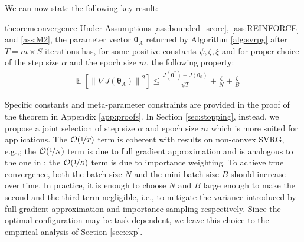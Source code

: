 \documentclass{article}
\makeatletter
\theoremstyle{remark}
\theoremstyle{definition}
\DeclareRobustCommand{\eg}{e.g.,\@\xspace}
\DeclareRobustCommand{\ie}{i.e.,\@\xspace}
\DeclareMathOperator*{\EV}{\mathbb{E}}
\newcommand{\EVV}[2][\ppvect \in \ppspace]{\EV_{#1}\left[{#2}\right]}
\newcommand{\norm}[2][\infty]{\left\|#2\right\|_{#1}}
\newcommand{\vtheta}{\boldsymbol{\theta}}
\makeatother
\begin{document}
We can now state the following key result:
\begin{restatable}{theorem}{convergence}\label{theo:convergence}
Under Assumptions \ref{ass:bounded_score}, \ref{ass:REINFORCE} and \ref{ass:M2}, the parameter vector $\vtheta_A$ returned by Algorithm \ref{alg:svrpg} after $T=m\times S$ iterations has, for some positive constants $\psi,\zeta, \xi$ and for proper choice of the step size $\alpha$ and the epoch size $m$, the following property:
\begin{align*}
	&\EVV[]
	{\norm[]{\nabla J(\vtheta_A)}^2} 
		\leq
		\frac{J(\vtheta^*)-J(\vtheta_0)}{\psi T} +
		\frac{\zeta}{N}
		+\frac{\xi}{B}
\end{align*}
\end{restatable}
Specific constants and meta-parameter constraints are provided in the proof of the theorem in Appendix \ref{app:proofs}. In Section \ref{sec:stopping}, instead, we propose a joint selection of step size $\alpha$ and epoch size $m$ which is more suited for applications. 
The $\mathcal{O}(\nicefrac{1}{T})$ term is coherent with results on non-convex SVRG, \eg \cite{reddi2016stochastic}; the $\mathcal{O}(\nicefrac{1}{N})$ term is due to full gradient approximation and is analogous to the one in \cite{harikandeh2015stopwasting}; the $\mathcal{O}(\nicefrac{1}{B})$ term is due to importance weighting. To achieve true convergence, both the batch size $N$ and the mini-batch size $B$ should increase over time. In practice, it is enough to choose $N$ and $B$ large enough to make the second and the third term negligible, \ie to mitigate the variance introduced by full gradient approximation and importance sampling respectively. Since the optimal configuration may be task-dependent, we leave this choice to the empirical analysis of Section \ref{sec:exp}. 
\end{document}
